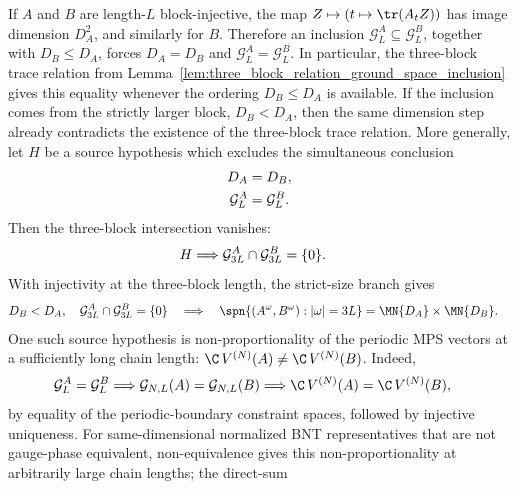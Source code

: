 \begin{lemma}
    \leanok
    If $A$ and $B$ are length-$L$ block-injective, the map
    $Z\mapsto(t\mapsto\tr(A_tZ))$ has image dimension $D_A^2$, and similarly
    for $B$. Therefore an inclusion
    $\mathcal G_L^A\subseteq\mathcal G_L^B$, together with $D_B\le D_A$,
    forces $D_A=D_B$ and $\mathcal G_L^A=\mathcal G_L^B$. In particular, the
    three-block trace relation from
    Lemma~\ref{lem:three_block_relation_ground_space_inclusion} gives this
    equality whenever the ordering $D_B\le D_A$ is available. If the inclusion
    comes from the strictly larger block, $D_B<D_A$, then the same dimension
    step already contradicts the existence of the three-block trace relation.
    More generally, let $H$ be a source hypothesis which excludes the
    simultaneous conclusion
    \begin{align}
        D_A            & = D_B,
        \notag                             \\
        \mathcal G_L^A & = \mathcal G_L^B.
        \notag
    \end{align}
    Then the three-block intersection vanishes:
    \begin{align}
        H
         & \Longrightarrow
        \mathcal G_{3L}^A\cap\mathcal G_{3L}^B=\{0\}.
        \notag
    \end{align}
    With injectivity at the three-block length, the strict-size branch gives
    \begin{align}
        D_B<D_A,\quad
        \mathcal G_{3L}^A\cap\mathcal G_{3L}^B=\{0\}
        \quad\Longrightarrow\quad
        \spn\{(A^\omega,B^\omega):|\omega|=3L\}
         & =
        \MN{D_A}\times\MN{D_B}.
        \notag
    \end{align}
    One such source hypothesis is non-proportionality of the periodic MPS
    vectors at a sufficiently long chain length:
    $\C\,V^{(N)}(A)\ne\C\,V^{(N)}(B)$.
    Indeed,
    \begin{align}
        \mathcal G_L^A=\mathcal G_L^B
         & \Longrightarrow
        \mathcal G_{N,L}(A)=\mathcal G_{N,L}(B) \Longrightarrow
        \C\,V^{(N)}(A)=\C\,V^{(N)}(B),
        \notag
    \end{align}
    by equality of the periodic-boundary constraint spaces, followed by
    injective uniqueness. For same-dimensional normalized BNT representatives
    that are not gauge-phase equivalent, non-equivalence gives
    this non-proportionality at arbitrarily large chain lengths; the direct-sum

\end{lemma}
